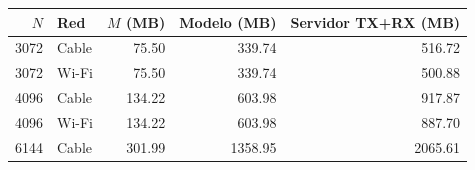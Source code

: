 \begin{center}
\small
\begin{tabular}{rlrrr}
\toprule
$N$ & Red & $M$ (MB) & Modelo (MB) & Servidor TX+RX (MB) \\
\midrule
3072 & Cable & 75.50 & 339.74 & 516.72 \\
3072 & Wi-Fi & 75.50 & 339.74 & 500.88 \\
4096 & Cable & 134.22 & 603.98 & 917.87 \\
4096 & Wi-Fi & 134.22 & 603.98 & 887.70 \\
6144 & Cable & 301.99 & 1358.95 & 2065.61 \\
\bottomrule
\end{tabular}
\end{center}
